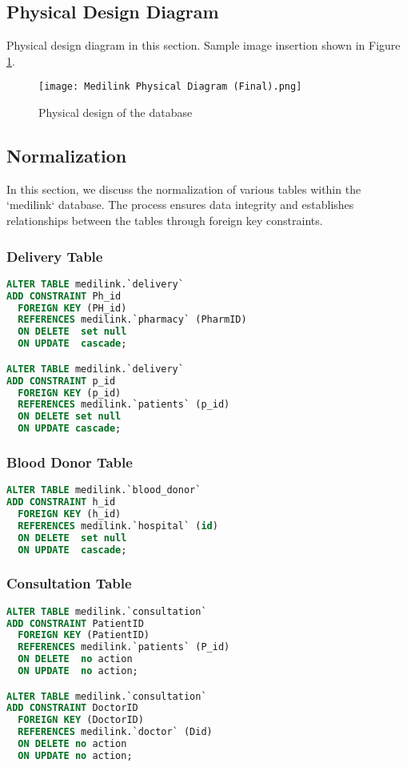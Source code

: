 \documentclass[11pt]{article}
\begin{document}
\subsection{Physical Design Diagram}
Physical design diagram in this section. Sample image insertion shown in Figure \ref{fig:3}.

\begin{figure}[H]
    \centering
    \texttt{[image: Medilink Physical Diagram (Final).png]}
    \caption{Physical design of the database}
    \label{fig:3}
\end{figure}




\subsection{Normalization}
In this section, we discuss the normalization of various tables within the `medilink` database. The process ensures data integrity and establishes relationships between the tables through foreign key constraints.
\subsubsection{Delivery Table}
\begin{lstlisting}[language=SQL]
ALTER TABLE medilink.`delivery` 
ADD CONSTRAINT Ph_id
  FOREIGN KEY (PH_id)
  REFERENCES medilink.`pharmacy` (PharmID)
  ON DELETE  set null
  ON UPDATE  cascade;

ALTER TABLE medilink.`delivery` 
ADD CONSTRAINT p_id
  FOREIGN KEY (p_id)
  REFERENCES medilink.`patients` (p_id)
  ON DELETE set null
  ON UPDATE cascade;
\end{lstlisting}

\subsubsection{Blood Donor Table}
\begin{lstlisting}[language=SQL]
ALTER TABLE medilink.`blood_donor` 
ADD CONSTRAINT h_id
  FOREIGN KEY (h_id)
  REFERENCES medilink.`hospital` (id)
  ON DELETE  set null
  ON UPDATE  cascade;
\end{lstlisting}

\subsubsection{Consultation Table}
\begin{lstlisting}[language=SQL]
ALTER TABLE medilink.`consultation` 
ADD CONSTRAINT PatientID
  FOREIGN KEY (PatientID)
  REFERENCES medilink.`patients` (P_id)
  ON DELETE  no action
  ON UPDATE  no action;

ALTER TABLE medilink.`consultation` 
ADD CONSTRAINT DoctorID
  FOREIGN KEY (DoctorID)
  REFERENCES medilink.`doctor` (Did)
  ON DELETE no action
  ON UPDATE no action;
\end{lstlisting}
\end{document}
